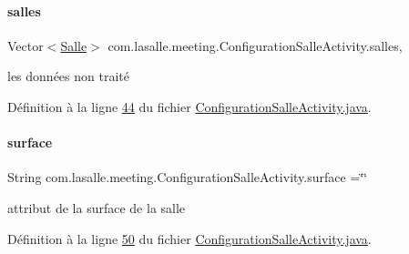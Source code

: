 \paragraph{\texorpdfstring{salles}{salles}}
{\footnotesize\ttfamily Vector$<$\hyperlink{classcom_1_1lasalle_1_1meeting_1_1_salle}{Salle}$>$ com.\+lasalle.\+meeting.\+Configuration\+Salle\+Activity.\+salles\hspace{0.3cm}{\ttfamily [static]}, {\ttfamily [private]}}



les données non traité 



Définition à la ligne \hyperlink{_configuration_salle_activity_8java_source_l00044}{44} du fichier \hyperlink{_configuration_salle_activity_8java_source}{Configuration\+Salle\+Activity.\+java}.

\mbox{\label{classcom_1_1lasalle_1_1meeting_1_1_configuration_salle_activity_a3d27df453e9f461eb7402a8f69ca7ae1}} 
\paragraph{\texorpdfstring{surface}{surface}}
{\footnotesize\ttfamily String com.\+lasalle.\+meeting.\+Configuration\+Salle\+Activity.\+surface =\char`\"{}\char`\"{}\hspace{0.3cm}{\ttfamily [private]}}



attribut de la surface de la salle 



Définition à la ligne \hyperlink{_configuration_salle_activity_8java_source_l00050}{50} du fichier \hyperlink{_configuration_salle_activity_8java_source}{Configuration\+Salle\+Activity.\+java}.

\mbox{\label{classcom_1_1lasalle_1_1meeting_1_1_configuration_salle_activity_a55224a88c619aa44eb96c0febc3f1857}} 
